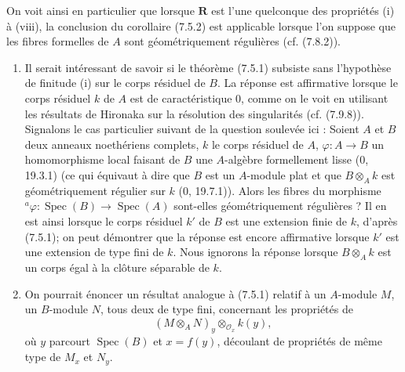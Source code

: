 \begin{examples}[7.5.3]
On voit ainsi en particulier que lorsque $\boldsymbol R$ est l'une quelconque
des propriétés (i) à (viii), la conclusion du corollaire (7.5.2) est applicable
lorsque l'on suppose que les fibres formelles de $A$ sont géométriquement
régulières (cf. (7.8.2)).
\end{examples}

\begin{remarks}[7.5.4]
\label{IV.2.s7.5.4-fr}
\begin{enumerate}
\item[\emph{(i)}] Il serait intéressant de savoir si le théorème (7.5.1)
subsiste sans l'hypothèse de finitude (i) sur le corps résiduel de $B$. La
réponse est affirmative lorsque le corps résiduel $k$ de $A$ est de
caractéristique 0, comme on le voit en utilisant les résultats de Hironaka sur
la résolution des singularités (cf. (7.9.8)). Signalons le cas particulier
suivant de la question soulevée ici : Soient $A$ et $B$ deux anneaux
noethériens complets, $k$ le corps résiduel de $A$,
$\varphi:A\to B$ un homomorphisme local faisant de $B$ une $A$-algèbre
formellement lisse (0, 19.3.1) (ce qui équivaut à dire que $B$ est un
$A$-module plat et que $B\otimes_A k$ est géométriquement régulier sur $k$
(0, 19.7.1)). Alors les fibres du morphisme
${}^a\varphi:\operatorname{Spec}(B)\to\operatorname{Spec}(A)$ sont-elles
géométriquement régulières ? Il en est ainsi lorsque le corps résiduel $k'$ de
$B$ est une extension finie de $k$, d'après (7.5.1); on peut démontrer que la
réponse est encore affirmative lorsque $k'$ est une extension de type fini de
$k$. Nous ignorons la réponse lorsque $B\otimes_A k$ est un corps égal à la
clôture séparable de $k$.

\item[\emph{(ii)}] On pourrait énoncer un résultat analogue à (7.5.1) relatif
à un $A$-module $M$, un $B$-module $N$, tous deux de type fini, concernant les
propriétés de
\[
(M\otimes_A N)_y\otimes_{\mathscr O_x}k(y),
\]
où $y$ parcourt $\operatorname{Spec}(B)$ et $x=f(y)$, découlant de propriétés
de même type de $M_x$ et $N_y$.


\end{enumerate}
\end{remarks}
